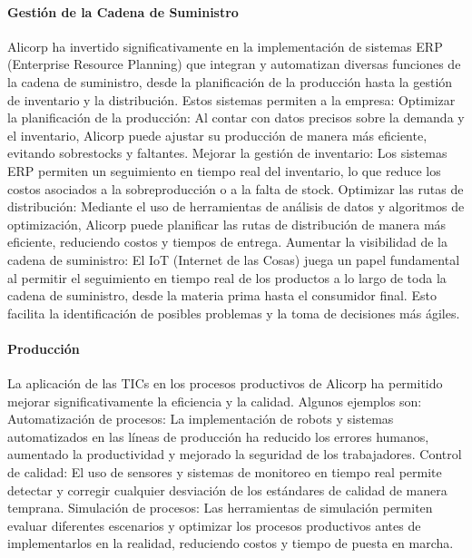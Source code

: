         \paragraph*{Gestión de la Cadena de Suministro} 
        Alicorp ha invertido significativamente en la implementación de sistemas ERP (Enterprise Resource Planning) que integran y automatizan diversas funciones de la cadena de suministro, desde la planificación de la producción hasta la gestión de inventario y la distribución. Estos sistemas permiten a la empresa: 
        Optimizar la planificación de la producción: Al contar con datos precisos sobre la demanda y el inventario, Alicorp puede ajustar su producción de manera más eficiente, evitando sobrestocks y faltantes. 
        Mejorar la gestión de inventario: Los sistemas ERP permiten un seguimiento en tiempo real del inventario, lo que reduce los costos asociados a la sobreproducción o a la falta de stock. 
        Optimizar las rutas de distribución: Mediante el uso de herramientas de análisis de datos y algoritmos de optimización, Alicorp puede planificar las rutas de distribución de manera más eficiente, reduciendo costos y tiempos de entrega. 
        Aumentar la visibilidad de la cadena de suministro: El IoT (Internet de las Cosas) juega un papel fundamental al permitir el seguimiento en tiempo real de los productos a lo largo de toda la cadena de suministro, desde la materia prima hasta el consumidor final. Esto facilita la identificación de posibles problemas y la toma de decisiones más ágiles. 

        \paragraph*{Producción}
        La aplicación de las TICs en los procesos productivos de Alicorp ha permitido mejorar significativamente la eficiencia y la calidad. Algunos ejemplos son: 
        Automatización de procesos: La implementación de robots y sistemas automatizados en las líneas de producción ha reducido los errores humanos, aumentado la productividad y mejorado la seguridad de los trabajadores. 
        Control de calidad: El uso de sensores y sistemas de monitoreo en tiempo real permite detectar y corregir cualquier desviación de los estándares de calidad de manera temprana. 
        Simulación de procesos: Las herramientas de simulación permiten evaluar diferentes escenarios y optimizar los procesos productivos antes de implementarlos en la realidad, reduciendo costos y tiempo de puesta en marcha. 
    
